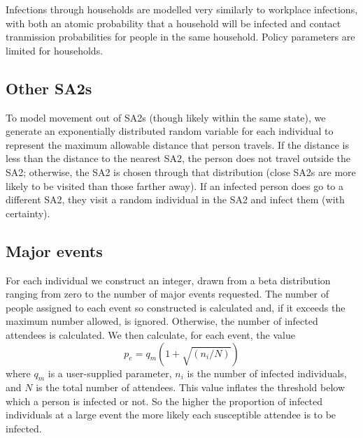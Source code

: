 \documentclass[a4paper,11pt]{scrreprt}
\begin{document}
Infections through households are modelled very similarly to workplace infections, 
with both an atomic probability that a household will be infected and contact
tranmission probabilities for people in the same household.
Policy parameters are limited for households.

\subsection{Other SA2s}

To model movement out of SA2s (though likely within the same state),
we generate an exponentially distributed random variable 
for each individual to represent the maximum allowable distance that person 
travels. If the distance is less than the distance to the nearest SA2, the person
does not travel outside the SA2; otherwise, the SA2 is chosen through that distribution
(close SA2s are more likely to be visited than those farther away).
 If an infected person does go to a different SA2, they visit a random individual in the SA2 and 
 infect them (with certainty).

\subsection{Major events}
For each individual we construct an integer, drawn from a beta distribution ranging from zero
to the number of major events requested. The number of people assigned to each event so constructed
is calculated and, if it exceeds the maximum number allowed, is ignored. Otherwise, the number of 
infected attendees is calculated. We then calculate, for each event, the value
\[p_e = q_m(1 + \sqrt{(n_i / N)}) \]
where \(q_m\) is a user-supplied parameter, \(n_i\) is the number of infected individuals, and \(N\)
is the total number of attendees. This value inflates the threshold below which a person is infected 
or not. So the higher the proportion of infected individuals at a large event the more likely each 
susceptible attendee is to be infected. 
\end{document}

